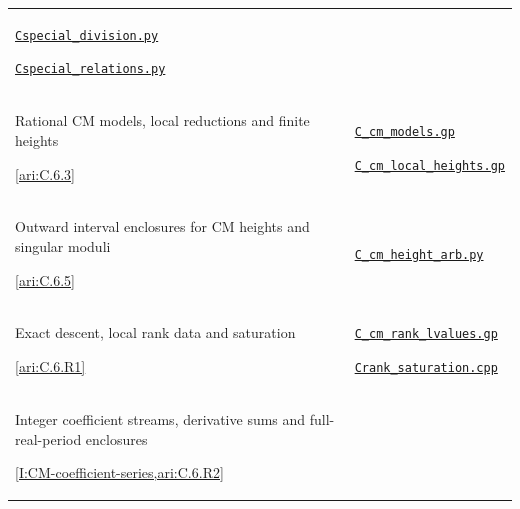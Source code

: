{\begin{longtable}{@{}>{\raggedright\arraybackslash}p{}>{\raggedright\arraybackslash}p{}@{}}
\href{https://raw.githubusercontent.com/KokunoYumeto/s6-complex-structure-workbench/\SsixRepositoryCommit/pro_returns/S6_10_PAPERS_checkpoint_15_20261119T1045Z/S6_10_PAPERS/code/I/replay_special/Cspecial_division.py}{\nolinkurl{Cspecial_division.py}}\par \href{https://raw.githubusercontent.com/KokunoYumeto/s6-complex-structure-workbench/\SsixRepositoryCommit/pro_returns/S6_10_PAPERS_checkpoint_15_20261119T1045Z/S6_10_PAPERS/code/I/replay_special/Cspecial_relations.py}{\nolinkurl{Cspecial_relations.py}} \\[3pt]
\hypertarget{prog:I:cm_models}{}Rational CM models, local reductions and finite heights\par \cref{ari:C.6.3} &
\href{https://raw.githubusercontent.com/KokunoYumeto/s6-complex-structure-workbench/\SsixRepositoryCommit/pro_returns/S6_10_PAPERS_checkpoint_15_20261119T1045Z/S6_10_PAPERS/code/I/replay_arithmetic/C_cm_models.gp}{\nolinkurl{C_cm_models.gp}}\par \href{https://raw.githubusercontent.com/KokunoYumeto/s6-complex-structure-workbench/\SsixRepositoryCommit/pro_returns/S6_10_PAPERS_checkpoint_15_20261119T1045Z/S6_10_PAPERS/code/I/replay_arithmetic/C_cm_local_heights.gp}{\nolinkurl{C_cm_local_heights.gp}} \\[3pt]
\hypertarget{prog:I:cm_heights}{}Outward interval enclosures for CM heights and singular moduli\par \cref{ari:C.6.5} &
\href{https://raw.githubusercontent.com/KokunoYumeto/s6-complex-structure-workbench/\SsixRepositoryCommit/pro_returns/S6_10_PAPERS_checkpoint_15_20261119T1045Z/S6_10_PAPERS/code/I/replay_arithmetic/C_cm_height_arb.py}{\nolinkurl{C_cm_height_arb.py}} \\[3pt]
\hypertarget{prog:I:ranks}{}Exact descent, local rank data and saturation\par \cref{ari:C.6.R1} &
\href{https://raw.githubusercontent.com/KokunoYumeto/s6-complex-structure-workbench/\SsixRepositoryCommit/pro_returns/S6_10_PAPERS_checkpoint_15_20261119T1045Z/S6_10_PAPERS/code/I/replay_arithmetic/C_cm_rank_lvalues.gp}{\nolinkurl{C_cm_rank_lvalues.gp}}\par \href{https://raw.githubusercontent.com/KokunoYumeto/s6-complex-structure-workbench/\SsixRepositoryCommit/pro_returns/S6_10_PAPERS_checkpoint_15_20261119T1045Z/S6_10_PAPERS/code/I/replay_arithmetic/Crank_saturation.cpp}{\nolinkurl{Crank_saturation.cpp}} \\[3pt]
\hypertarget{prog:I:derivatives}{}Integer coefficient streams, derivative sums and full-real-period enclosures\par \cref{I:CM-coefficient-series,ari:C.6.R2} &

\end{longtable}}
